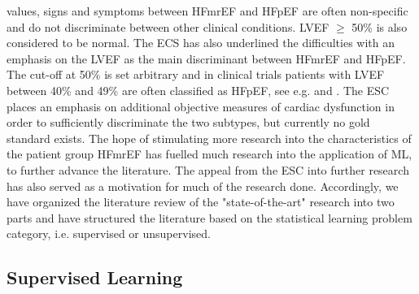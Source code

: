 \documentclass[../thesis.tex]{subfiles}
\begin{document}


\noindent values, signs and symptoms between HFmrEF and HFpEF are often non-specific and do not discriminate between other clinical conditions. LVEF $\geq$ 50\% is also considered to be normal. The ECS has also underlined the difficulties with an emphasis on the LVEF as the main discriminant between HFmrEF and HFpEF. The cut-off at 50\% is set arbitrary and in clinical trials patients with LVEF between 40\% and 49\% are often classified as HFpEF, see e.g. \cite{kelly2015patient} and \cite{ponikowski2016}. The ESC places an emphasis on additional objective measures of cardiac dysfunction in order to sufficiently discriminate the two subtypes, but currently no gold standard exists. The hope of stimulating more research into the characteristics of the patient group HFmrEF has fuelled much research into the application of ML, to further advance the literature. The appeal from the ESC into further research has also served as a motivation for much of the research done.  Accordingly, we have organized the literature review of the "state-of-the-art" research into two parts and have structured the literature based on the statistical learning problem category, i.e. supervised or unsupervised.

\subsection{Supervised Learning}
\label{subsec:supervisedlearn}
\end{document}
